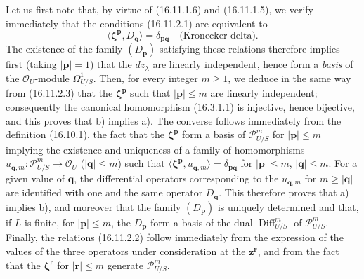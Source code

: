 Let us first note that, by virtue of (16.11.1.6) and (16.11.1.5), we verify
immediately that the conditions (16.11.2.1) are equivalent to
\[
  \langle\boldsymbol{\zeta}^{\mathbf{p}},D_{\mathbf{q}}\rangle
  =\delta_{\mathbf{p}\mathbf{q}}
  \quad\text{(Kronecker delta)}.
  \tag{16.11.2.3}
  \label{IV.16.11.2.3}
\]
The existence of the family $(D_{\mathbf{p}})$ satisfying these relations
therefore implies first (taking $|\mathbf{p}|=1$) that the $dz_\lambda$ are
linearly independent, hence form a \emph{basis} of the
$\mathcal{O}_U$-module $\Omega_{U/S}^1$. Then, for every integer $m\geq1$, we
deduce in the same way from (16.11.2.3) that the
$\boldsymbol{\zeta}^{\mathbf{p}}$ such that $|\mathbf{p}|\leq m$ are linearly
independent; consequently the canonical homomorphism (16.3.1.1) is injective,
hence bijective, and this proves that b) implies a). The converse follows
immediately from the definition (16.10.1), the fact that the
$\boldsymbol{\zeta}^{\mathbf{p}}$ form a basis of $\mathscr{P}_{U/S}^m$ for
$|\mathbf{p}|\leq m$ implying the existence and uniqueness of a family of
homomorphisms $u_{\mathbf{q},m}:\mathscr{P}_{U/S}^m\to\mathcal{O}_U$
($|\mathbf{q}|\leq m$) such that
$\langle\boldsymbol{\zeta}^{\mathbf{p}},u_{\mathbf{q},m}\rangle
=\delta_{\mathbf{p}\mathbf{q}}$ for $|\mathbf{p}|\leq m$,
$|\mathbf{q}|\leq m$. For a given value of $\mathbf{q}$, the differential
operators corresponding to the $u_{\mathbf{q},m}$ for
$m\geq|\mathbf{q}|$ are identified with one and the same operator
$D_{\mathbf{q}}$. This therefore proves that a) implies b), and moreover that
the family $(D_{\mathbf{p}})$ is uniquely determined and that, if $L$ is
finite, for $|\mathbf{p}|\leq m$, the $D_{\mathbf{p}}$ form a basis of the
dual $\operatorname{Diff}_{U/S}^m$ of $\mathscr{P}_{U/S}^m$. Finally, the
relations (16.11.2.2) follow immediately from the expression of the values of
the three operators under consideration at the $\mathbf{z}^{\mathbf{r}}$, and
from the fact that the $\boldsymbol{\zeta}^{\mathbf{r}}$ for
$|\mathbf{r}|\leq m$ generate $\mathscr{P}_{U/S}^m$.


